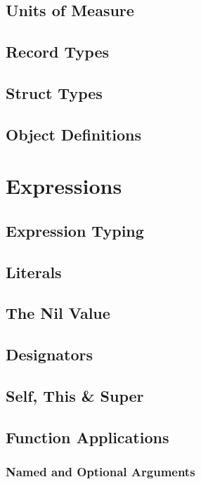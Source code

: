 \section{Units of Measure}

\section{Record Types}

\section{Struct Types}

\section{Object Definitions}

\chapter{Expressions}

\section{Expression Typing}

\section{Literals}

\section{The Nil Value}

\section{Designators}

\section{Self, This \& Super}

\section{Function Applications}

\subsection{Named and Optional Arguments}

